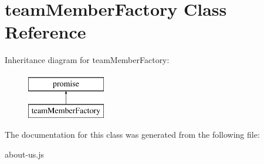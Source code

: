\hypertarget{classteamMemberFactory}{\section{team\-Member\-Factory Class Reference}
\label{classteamMemberFactory}
}
Inheritance diagram for team\-Member\-Factory\-:\begin{figure}[H]
\begin{center}
\leavevmode
\includegraphics[height=2.000000cm]{classteamMemberFactory}
\end{center}
\end{figure}


The documentation for this class was generated from the following file\-:\begin{DoxyCompactItemize}
\item 
about-\/us.\-js\end{DoxyCompactItemize}
